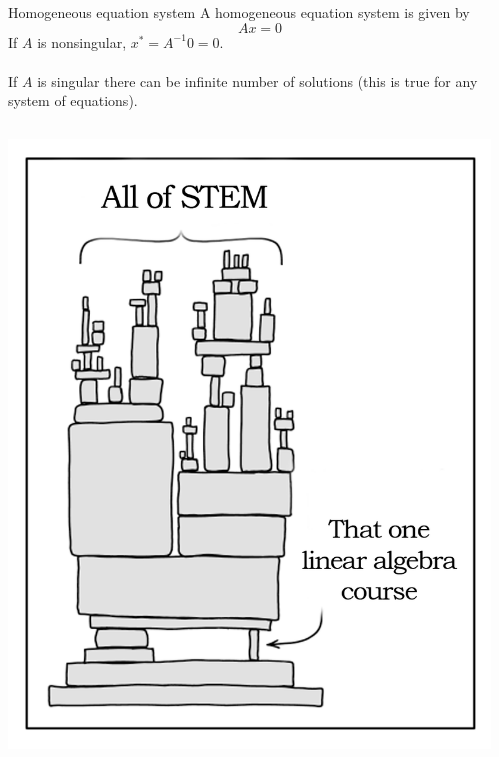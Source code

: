 \documentclass{./../../Latex/teaching_slides}
\begin{document}
 \begin{frame}{Homogeneous equation system}
A homogeneous equation system is given by 
$$ Ax = 0$$
If $A$ is nonsingular, $x^* = A^{-1} 0 = 0$. \\~\\
 If $A$ is singular there can be infinite number of solutions (this is true for any system of equations).
\end{frame}

 \begin{frame}
 \centering
\begin{columns}[T]
\begin{column}[c]{0.5\textwidth}
  	\includegraphics[scale=0.225]{stem_linal.png}
\end{column}	
\begin{column}[c]{0.25\textwidth}
\end{column}	
\end{columns}
\end{frame}
\end{document}
